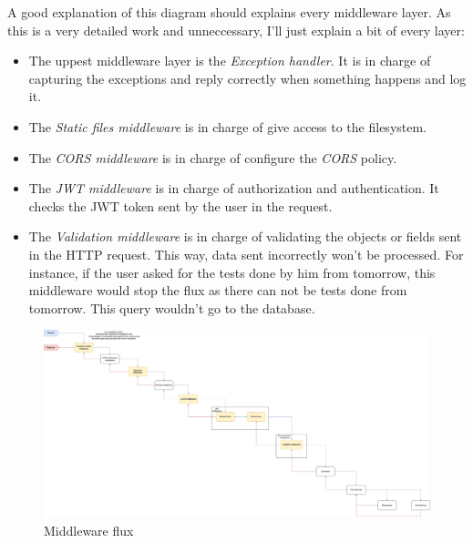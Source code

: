     A good explanation of this diagram should explains every middleware layer. As this is a very detailed work and unneccessary, I'll just explain a bit of every layer:
    \begin{itemize}[noitemsep]
        \item The uppest middleware layer is the \textit{Exception handler}. It is in charge of capturing the exceptions and reply correctly when something happens and log it.
        \item The \textit{Static files middleware} is in charge of give access to the filesystem. \\
        \item The \textit{CORS middleware} is in charge of configure the \textit{CORS} policy. \\
        \item The \textit{JWT middleware} is in charge of authorization and authentication. It checks the {JWT token} sent by the user in the request. 
        \item The \textit{Validation middleware} is in charge of validating the objects or fields sent in the {HTTP request}. This way, data sent incorrectly won't be processed. For instance, if the user asked for the tests done by him from tomorrow, this middleware would stop the flux as there can not be tests done from tomorrow. This query wouldn't go to the database. 
    \end{itemize}
        \newpage
        \begin{figure}[H]
            \centering
                \includegraphics[angle=90, width=\textwidth, height=\textheight]{assets/diagrams/middleware.png}
            \caption{Middleware flux}
            \label{fig:implementation_middleware}
        \end{figure}


